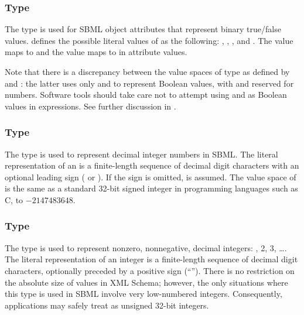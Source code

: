 \subsubsection{Type }
\label{sec:boolean}

The \xmlschemaone type  is used for SBML object
attributes that represent binary true/false values.  \xmlschemaone
defines the possible literal values of  as the
following: , , , and .  The
value  maps to  and the value  maps to
 in attribute values.

Note that there is a discrepancy between the value spaces of type
 as defined by \xmlschemaone and \mathml: the
latter uses only  and  to represent Boolean
values, with  and  reserved for numbers.  Software
tools should take care not to attempt using  and  as
Boolean values in \mathml expressions.  See further discussion in
.


\subsubsection{Type }
\label{sec:integer}

The \xmlschemaone type  is used to represent decimal
integer numbers in SBML.  The literal representation of an
 is a finite-length sequence of decimal digit
characters with an optional leading sign (\val{+} or \val{-}).  If
the sign is omitted, \val{+} is assumed.  The value space of
 is the same as a standard 32-bit signed integer in
programming languages such as C,  to $-2147483648$.


\subsubsection{Type }
\label{sec:positiveinteger}

The \xmlschemaone type  is used to
represent nonzero, nonnegative, decimal integers: , 2, 3,
\ldots.  The literal representation of an integer is a
finite-length sequence of decimal digit characters, optionally
preceded by a positive sign (``\token{+}'').  There is no
restriction on the absolute size of 
values in XML Schema; however, the only situations where this type
is used in SBML involve very low-numbered integers.  Consequently,
applications may safely treat  as
unsigned 32-bit integers.


